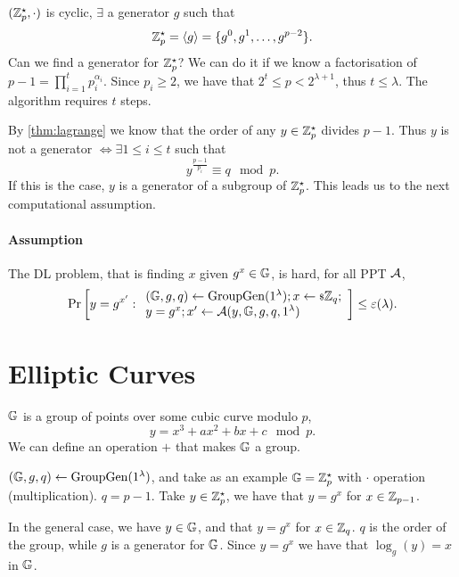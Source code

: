 $(\mathbb{Z}_p^{\star}, \cdot)$ is cyclic, \ie $\exists$ a generator $g$ such that
\begin{equation*}
	\mathbb{Z}_p^{\star} = \left< {g} \right> = \{ g^0, g^1, \dots, g^{p-2} \}.
\end{equation*}
Can we find a generator for $\mathbb{Z}_p^{\star}$?
We can do it if we know a factorisation of $p-1 = \prod_{i=1}^{t} p_i^{\alpha_i}$.
Since $p_i \ge 2$, we have that $2^t \le p < 2^{\lambda+1}$, thus $t \le \lambda$.
The algorithm requires $t$ steps.

By \cref{thm:lagrange} we know that the order of any $y \in \mathbb{Z}_p^{\star}$ divides $p-1$.
Thus $y$ is not a generator $\iff \exists 1 \le i \le t$ such that
\begin{equation*}
	y^{\frac{p-1}{p_i}} \equiv q \mod p.
\end{equation*}
If this is the case, $y$ is a generator of a subgroup of $\mathbb{Z}_p^{\star}$.
This leads us to the next computational assumption.

\paragraph{Assumption}
The \ac{DL} problem, that is finding $x$ given $g^x \in \mathbb{G}$, is hard, \ie for all \ac{PPT} $\mathcal{A}$,
\begin{equation*}
	\mathop{\mathrm{Pr}}\limits_{} \left[ {
		y = g^{x'} :
		\begin{array}{l}
			(\mathbb{G} , \allowbreak g , \allowbreak q) \leftarrow \mathrm{GroupGen}(1^{\lambda}); x \leftarrow {\scriptstyle \$} {\mathbb{Z}_q}; \\
			y = g^x; x' \leftarrow \mathcal{A}(y, \mathbb{G}, g, q, 1^{\lambda})
		\end{array}
	} \right]
	\le \varepsilon(\lambda).
\end{equation*} 

\section{Elliptic Curves}

$\mathbb{G}$ is a group of points over some cubic curve modulo $p$, \ie
\begin{equation*}
	y = x^3 + a x^2 + b x + c \mod p.
\end{equation*}
We can define an operation $+$ that makes $\mathbb{G}$ a group.

$(\mathbb{G} , \allowbreak g , \allowbreak q) \leftarrow \mathrm{GroupGen}(1^{\lambda})$, and take as an example $\mathbb{G} = \mathbb{Z}_p^{\star}$ with $\cdot$ operation (multiplication).
$q = p-1$.
Take $y \in \mathbb{Z}_p^{\star}$, we have that $y = g^x$ for $x \in \mathbb{Z}_{p-1}$.

In the general case, we have $y \in \mathbb{G}$, and that $y = g^x$ for $x \in \mathbb{Z}_q$.
$q$ is the order of the group, while $g$ is a generator for $\mathbb{G}$.
Since $y = g^x$ we have that $\log_g(y) = x$ in $\mathbb{G}$.

